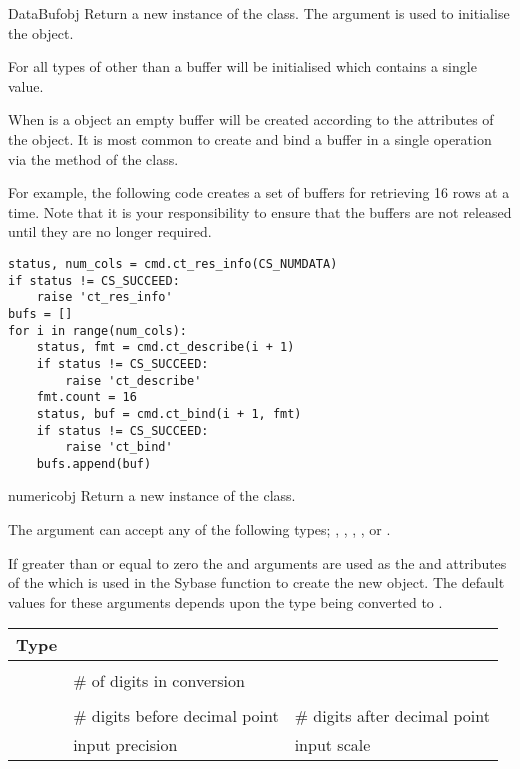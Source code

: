 \begin{funcdesc}{DataBuf}{obj}
Return a new instance of the  class.  The 
argument is used to initialise the  object.

For all types of  other than  a buffer will
be initialised which contains a single value.

When  is a  object an empty buffer will be
created according to the attributes of the  object.
It is most common to create and bind a buffer in a single operation
via the  method of the  class.

For example, the following code creates a set of buffers for
retrieving 16 rows at a time.  Note that it is your responsibility to
ensure that the buffers are not released until they are no longer
required.

\begin{verbatim}
status, num_cols = cmd.ct_res_info(CS_NUMDATA)
if status != CS_SUCCEED:
    raise 'ct_res_info'
bufs = []
for i in range(num_cols):
    status, fmt = cmd.ct_describe(i + 1)
    if status != CS_SUCCEED:
        raise 'ct_describe'
    fmt.count = 16
    status, buf = cmd.ct_bind(i + 1, fmt)
    if status != CS_SUCCEED:
        raise 'ct_bind'
    bufs.append(buf)
\end{verbatim}
\end{funcdesc}

\begin{funcdesc}{numeric}{obj  }
Return a new instance of the  class.

The  argument can accept any of the following types;
, , , ,
or .

If greater than or equal to zero the  and 
arguments are used as the  and 
attributes of the  which is used in the Sybase
 function to create the new 
object.  The default values for these arguments depends upon the type
being converted to .

\begin{longtable}{l|l|l}
Type & \var{precision} & \var{scale} \\
\hline
\code{IntType}     & \code{16} & \code{0} \\
\code{LongType}    & \# of digits in \code{str()} conversion & \code{0} \\
\code{FloatType}   & \code{CS_MAX_PREC} & \code{12} \\
\code{StringType}  & \# digits before decimal point & \# digits after decimal point \\
\code{NumericType} & input precision & input scale \\
\end{longtable}
\end{funcdesc}

